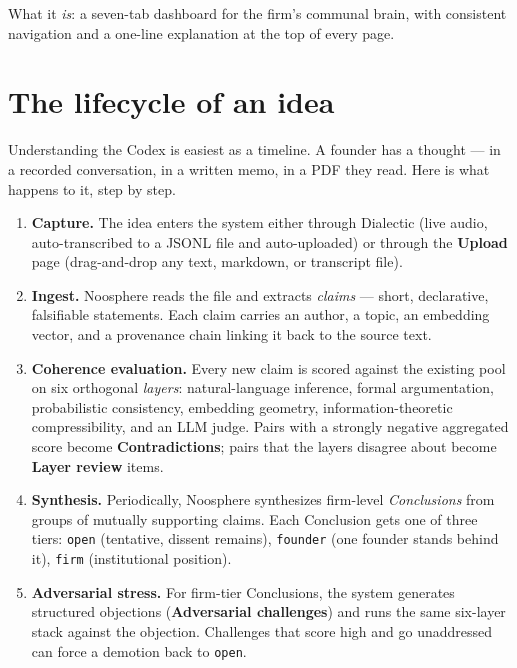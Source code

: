 \documentclass[11pt,letterpaper]{article}
\newcommand{\page}[1]{\textbf{#1}}
\begin{document}
What it \emph{is}: a seven-tab dashboard for the firm's communal brain, with consistent navigation and a one-line explanation at the top of every page.

\section{The lifecycle of an idea}

Understanding the Codex is easiest as a timeline. A founder has a thought --- in a recorded conversation, in a written memo, in a PDF they read. Here is what happens to it, step by step.

\begin{enumerate}[leftmargin=*,itemsep=0.3em]
  \item \textbf{Capture.} The idea enters the system either through Dialectic (live audio, auto-transcribed to a JSONL file and auto-uploaded) or through the \page{Upload} page (drag-and-drop any text, markdown, or transcript file).

  \item \textbf{Ingest.} Noosphere reads the file and extracts \emph{claims} --- short, declarative, falsifiable statements. Each claim carries an author, a topic, an embedding vector, and a provenance chain linking it back to the source text.

  \item \textbf{Coherence evaluation.} Every new claim is scored against the existing pool on six orthogonal \emph{layers}: natural-language inference, formal argumentation, probabilistic consistency, embedding geometry, information-theoretic compressibility, and an LLM judge. Pairs with a strongly negative aggregated score become \page{Contradictions}; pairs that the layers disagree about become \page{Layer review} items.

  \item \textbf{Synthesis.} Periodically, Noosphere synthesizes firm-level \emph{Conclusions} from groups of mutually supporting claims. Each Conclusion gets one of three tiers: \texttt{open} (tentative, dissent remains), \texttt{founder} (one founder stands behind it), \texttt{firm} (institutional position).

  \item \textbf{Adversarial stress.} For firm-tier Conclusions, the system generates structured objections (\page{Adversarial challenges}) and runs the same six-layer stack against the objection. Challenges that score high and go unaddressed can force a demotion back to \texttt{open}.


\end{enumerate}
\end{document}
